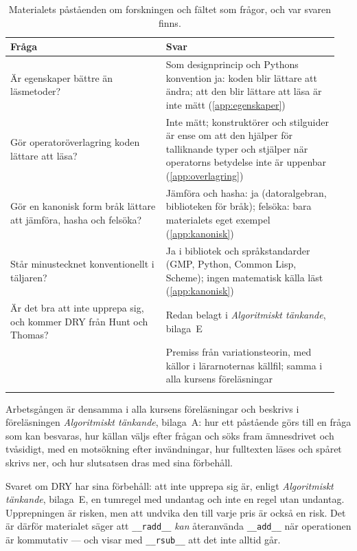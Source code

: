 \begin{table}[htbp]
  \centering
  \caption{Materialets påståenden om forskningen och fältet som frågor,
    och var svaren finns.}
  \label{tab:redan-belagt}
  \begin{tabular}{@{}p{0.45\linewidth}p{0.5\linewidth}@{}}
    \toprule
    Fråga & Svar \\
    \midrule
    Är egenskaper bättre än läsmetoder? & Som designprincip och Pythons
      konvention ja: koden blir lättare att ändra; att den blir lättare
      att läsa är inte mätt (\cref{app:egenskaper}) \\
    Gör operatoröverlagring koden lättare att läsa? & Inte mätt;
      konstruktörer och stilguider är ense om att den hjälper för
      talliknande typer och stjälper när operatorns betydelse inte är
      uppenbar (\cref{app:overlagring}) \\
    Gör en kanonisk form bråk lättare att jämföra, hasha och felsöka? &
      Jämföra och hasha: ja (datoralgebran, biblioteken för bråk);
      felsöka: bara materialets eget exempel (\cref{app:kanonisk}) \\
    Står minustecknet konventionellt i täljaren? & Ja i bibliotek och
      språkstandarder (GMP, Python, Common Lisp, Scheme); ingen
      matematisk källa läst (\cref{app:kanonisk}) \\
    Är det bra att inte upprepa sig, och kommer DRY från Hunt och
      Thomas? & Redan belagt i \emph{Algoritmiskt tänkande}, bilaga~E \\
    \ifbool{ltnote}{%
    Är det som varierar mot en invariant bakgrund det som kan
      urskiljas? & Premiss från variationsteorin, med källor i
      lärarnoternas källfil; samma i alla kursens föreläsningar \\
    }{}%
    \bottomrule
  \end{tabular}
\end{table}

Arbetsgången är densamma i alla kursens föreläsningar och beskrivs i
föreläsningen \emph{Algoritmiskt tänkande}, bilaga~A: hur ett påstående
görs till en fråga som kan besvaras, hur källan väljs efter frågan och
söks fram ämnesdrivet och tvåsidigt, med en motsökning efter
invändningar, hur fulltexten läses och spåret skrivs ner, och hur
slutsatsen dras med sina förbehåll.

Svaret om DRY har sina förbehåll: att inte upprepa sig är, enligt
\emph{Algoritmiskt tänkande}, bilaga~E, en tumregel med undantag och
inte en regel utan undantag.  Upprepningen är risken, men att undvika
den till varje pris är också en risk.  Det är därför materialet säger
att \texttt{__radd__} \emph{kan} återanvända
\texttt{__add__} när operationen är kommutativ --- och visar
med \texttt{__rsub__} att det inte alltid går.

